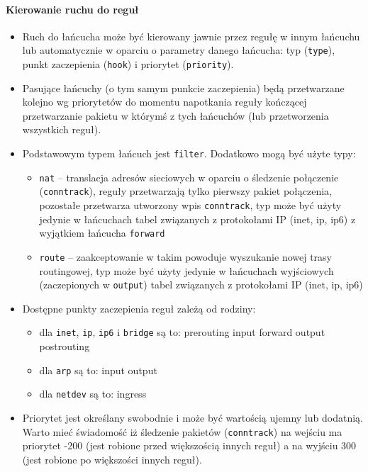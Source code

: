 \documentclass{pdfBooklets}
\begin{document}
\paragraph{Kierowanie ruchu do reguł}
\begin{itemize}
	\item Ruch do łańcucha może być kierowany jawnie przez regułę w innym łańcuchu lub automatycznie w oparciu o parametry danego łańcucha: typ (\Verb#type#), punkt zaczepienia (\Verb#hook#) i priorytet (\Verb#priority#).
	\item Pasujące łańcuchy (o tym samym punkcie zaczepienia) będą przetwarzane kolejno wg priorytetów do momentu napotkania reguły kończącej przetwarzanie pakietu w którymś z tych łańcuchów (lub przetworzenia wszystkich reguł).
	\item Podstawowym typem łańcuch jest \Verb#filter#. Dodatkowo mogą być użyte typy:
	\begin{itemize}
		\item \Verb#nat# –
			translacja adresów sieciowych w oparciu o śledzenie połączenie (\Verb#conntrack#),
			reguły przetwarzają tylko pierwszy pakiet połączenia, pozostałe przetwarza utworzony wpis \Verb#conntrack#,
			typ może być użyty jedynie w łańcuchach tabel związanych z protokołami IP (inet, ip, ip6) z wyjątkiem łańcucha \Verb#forward#
		\item \Verb#route# –
			zaakceptowanie w takim powoduje wyszukanie nowej trasy routingowej,
			typ może być użyty jedynie w łańcuchach wyjściowych (zaczepionych w \Verb#output#) tabel związanych z protokołami IP (inet, ip, ip6)
	\end{itemize}
	\item Dostępne punkty zaczepienia reguł zależą od rodziny:
	\begin{itemize}
		\item dla \Verb#inet#, \Verb#ip#, \Verb#ip6# i \Verb#bridge# są to:
			prerouting
			input
			forward
			output
			postrouting
		\item dla \Verb#arp# są to:
			input
			output
		\item dla \Verb#netdev# są to:
			ingress
	\end{itemize}
	\item Priorytet jest określany swobodnie i może być wartością ujemny lub dodatnią.
		Warto mieć świadomość iż śledzenie pakietów (\Verb#conntrack#) na wejściu ma priorytet -200 (jest robione przed większością innych reguł) a na wyjściu 300 (jest robione po większości innych reguł).
\end{itemize}
\end{document}
